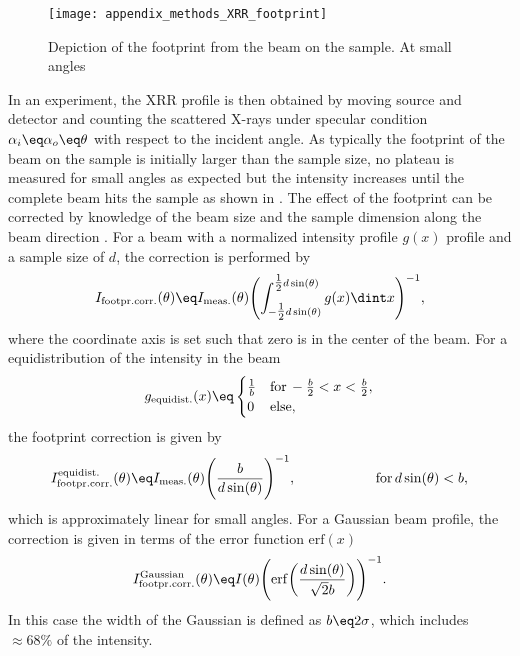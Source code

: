 \documentclass[\main/dresen_thesis.tex]{subfiles}
\begin{document}
    \begin{figure}[tb]
      \centering
      \texttt{[image: appendix\_methods\_XRR\_footprint]}
      \caption{\label{fig:appendix:methods:xrr:footprint}Depiction of the footprint from the beam on the sample. At small angles }
    \end{figure}

    In an experiment, the XRR profile is then obtained by moving source and detector and counting the scattered X-rays under specular condition $\alpha_i \eq \alpha_o \eq \theta$ with respect to the incident angle.
    As typically the footprint of the beam on the sample is initially larger than the sample size, no plateau is measured for small angles as expected but the intensity increases until the complete beam hits the sample as shown in .
    The effect of the footprint can be corrected by knowledge of the beam size and the sample dimension along the beam direction \cite{Gibaud_1993_Theco}.
    For a beam with a normalized intensity profile $g(x)$ profile and a sample size of $d$, the correction is performed by
    \begin{align}
      I_\mathrm{footpr. corr.}(\theta) \eq I_\mathrm{meas.}(\theta) \Biggl( \int_{-\tfrac{1}{2}d \sin(\theta)}^{\tfrac{1}{2}d \sin(\theta)} g(x) \dint x \Biggr)^{-1},
    \end{align}
    where the coordinate axis is set such that zero is in the center of the beam.
    For a equidistribution of the intensity in the beam
    \begin{align}
      g_\mathrm{equidist.}(x) \eq \begin{cases}
        \frac{1}{b}& \mathrm{for\,}-\frac{b}{2} < x < \frac{b}{2},\\
        0&\mathrm{else},
      \end{cases}
    \end{align}
    the footprint correction is given by
    \begin{align}
      I_\mathrm{footpr. corr.}^\mathrm{equidist.}(\theta) \eq I_\mathrm{meas.}(\theta) \Biggl( \frac{b}{d \sin(\theta)}\Biggr)^{-1},\hspace{2cm}\mathrm{for\,}d\sin(\theta)<b ,
    \end{align}
    which is approximately linear for small angles.
    For a Gaussian beam profile, the correction is given in terms of the error function $\mathrm{erf}(x)$
    \begin{align}
      I_\mathrm{footpr. corr.}^\mathrm{Gaussian}(\theta) \eq I(\theta) \Biggl( \mathrm{erf}\biggl( \frac{d \sin(\theta)}{\sqrt{2}b} \biggr) \Biggr)^{-1}.
    \end{align}
    In this case the width of the Gaussian is defined as $b \eq 2 \sigma$, which includes $\approx 68 \%$ of the intensity.
\end{document}
